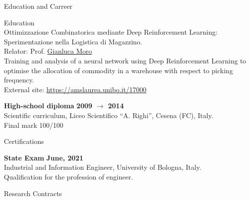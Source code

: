 \documentclass{resume} %
\begin{document}
\begin{rSection}{Education and Carreer}
\begin{rSubsection2}{Education}
            \\Ottimizzazione Combinatorica mediante Deep Reinforcement Learning: Sperimentazione nella Logistica di Magazzino.
            \\Relator: Prof. \href{mailto:gianluca.moro@unibo.it}{Gianluca Moro}
            \\Training and analysis of a neural network using Deep Reinforcement Learning to optimise the allocation of commodity in a warehouse with respect to picking frequency.
            \\External site: \url{https://amslaurea.unibo.it/17000}
            \item\textbf{ High-school diploma }\hfill \textbf{2009 $\rightarrow$ 2014}
            \\Scientific curriculum, Liceo Scientifico ``A. Righi'', Cesena (FC), Italy.
            \\Final mark 100/100
        \end{rSubsection2}


        \begin{rSubsection2}{Certifications}

            \item\textbf{ State Exam }\hfill \textbf{June, 2021}
            \\Industrial and Information Engineer, University of Bologna, Italy.
            \\Qualification for the profession of engineer.

        \end{rSubsection2}


        \begin{rSubsection2}{Research Contracts}


\end{rSubsection2}
\end{rSection}
\end{document}
